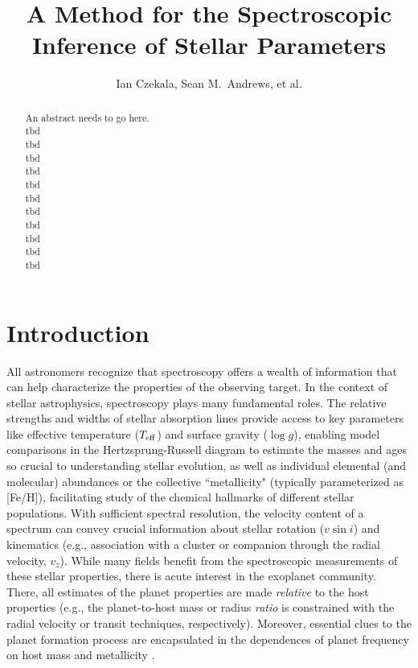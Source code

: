 \documentclass[iop,floatfix]{emulateapj}
\begin{document}
\graphicspath{{figs/}}


\title{A Method for the Spectroscopic Inference of Stellar Parameters}
\author{Ian Czekala, Sean M.~Andrews, et al.}

\begin{abstract}
An abstract needs to go here. \\
tbd \\
tbd \\
tbd \\
tbd \\
tbd \\
tbd \\
tbd \\
tbd \\
tbd \\
tbd \\
tbd
\end{abstract}


\section{Introduction} \label{sec:intro}

All astronomers recognize that spectroscopy offers a wealth of information that can help
characterize the properties of the observing target.  In the context of stellar astrophysics, 
spectroscopy plays many fundamental roles.  The relative strengths and widths of stellar absorption 
lines provide access to key parameters like effective temperature ($T_{\rm eff}$) and surface 
gravity ($\log g$), enabling model comparisons in the Hertzsprung-Russell diagram to estimate the 
masses and ages so crucial to understanding stellar evolution, as well as individual elemental (and 
molecular) abundances or the collective ``metallicity" (typically parameterized as [Fe/H]), 
facilitating study of the chemical hallmarks of different stellar populations.  With sufficient 
spectral resolution, the velocity content of a spectrum can convey crucial information about 
stellar rotation ($v \sin i$) and kinematics (e.g., association with a cluster or companion through 
the radial velocity, $v_z$).  While many fields benefit from the spectroscopic measurements of 
these stellar properties, there is acute interest in the exoplanet community.  There, all estimates 
of the planet properties are made {\it relative} to the host properties (e.g., the planet-to-host 
mass or radius {\it ratio} is constrained with the radial velocity or transit techniques, 
respectively).  Moreover, essential clues to the planet formation process are encapsulated in the 
dependences of planet frequency on host mass \citep[e.g.,][]{johnson07,howard10} and metallicity 
\citep[e.g.,][]{fischer05,buchhave14}.   
\end{document}

